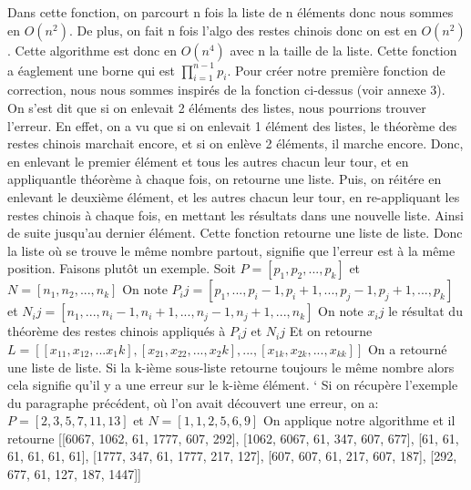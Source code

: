 \documentclass[a4paper, 11pt]{report}
\begin{document}
Dans cette fonction, on parcourt n fois la liste de n éléments donc nous sommes en $O(n^2)$. De plus, on fait n fois l'algo des restes chinois donc on est en $O(n^2)$. Cette algorithme est donc en $O(n^4)$ avec n la taille de la liste.
Cette fonction a éaglement une borne qui est $ \prod_{i=1}^{n-1} p_i $.
\newline 
\newline
Pour créer notre première fonction de correction, nous nous sommes inspirés de la fonction ci-dessus (voir annexe 3). On s'est dit que si on enlevait 2 éléments des listes, nous pourrions trouver l'erreur. 
En effet, on a vu que si on enlevait 1 élément des listes, le théorème des restes chinois marchait encore, et si on enlève 2 éléments, il marche encore. Donc, en enlevant le premier élément et tous les autres chacun leur
tour, et en appliquantle théorème à chaque fois, on retourne une liste. Puis, on réitére en enlevant le deuxième élément, et les autres chacun leur tour, en re-appliquant les restes chinois à chaque fois, en mettant les résultats dans
une nouvelle liste. Ainsi de suite jusqu'au dernier élément. Cette fonction retourne une liste de liste. Donc la liste où se trouve le même nombre partout, signifie que l'erreur est à la même position.
Faisons plutôt un exemple.
\newline 
Soit $P=[p_1, p_2, ... , p_k]$ et $N=[n_1 , n_2, ... ,n_k]$ \newline
On note $P_ij =[p_1 , ... , p_i-1 , p_i+1 , ... , p_j-1 , p_j+1 , ... , p_k]$ et $N_ij=[n_1, ..., n_i-1, n_i+1, ..., n_j-1, n_j+1, ..., n_k]$ \newline
On note $x_ij$ le résultat du théorème des restes chinois appliqués à $P_ij$ et $N_ij$ \newline
Et on retourne $L=[[x_11,x_12,...x_1k],[x_21,x_22,...,x_2k],...,[x_{1k},x_{2k},...,x_{kk}]]$ \newline
On a retourné une liste de liste. Si la k-ième sous-liste retourne toujours le même nombre alors cela signifie qu'il y a une erreur sur le k-ième élément. \newline`
\newline
Si on récupère l'exemple du paragraphe précédent, où l'on avait découvert une erreur, \newline
on a: $P=[2,3,5,7,11,13]$ et $N=[1,1,2,5,6,9]$ \newline
On applique notre algorithme et il retourne
[[6067, 1062, 61, 1777, 607, 292], [1062, 6067, 61, 347, 607, 677], [61, 61, 61, 61, 61, 61], [1777, 347, 61, 1777, 217, 127], [607, 607, 61, 217, 607, 187], [292, 677, 61, 127, 187, 1447]] \newline
\end{document}
